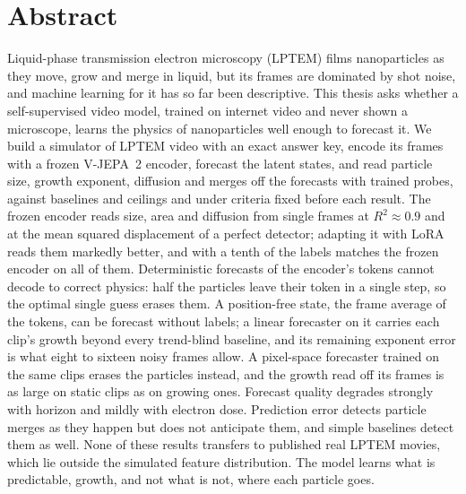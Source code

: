 \section*{Abstract}

Liquid-phase transmission electron microscopy (LPTEM) films nanoparticles as they move,
grow and merge in liquid, but its frames are dominated by shot noise, and machine
learning for it has so far been descriptive. This thesis asks whether a self-supervised
video model, trained on internet video and never shown a microscope, learns the physics
of nanoparticles well enough to forecast it. We build a simulator of LPTEM video with an
exact answer key, encode its frames with a frozen V-JEPA~2 encoder, forecast the latent
states, and read particle size, growth exponent, diffusion and merges off the forecasts
with trained probes, against baselines and ceilings and under criteria fixed before each
result. The frozen encoder reads size, area and diffusion from single frames at
$R^2 \approx 0.9$ and at the mean squared displacement of a perfect detector; adapting it
with LoRA reads them markedly better, and with a tenth of the labels matches the frozen
encoder on all of them. Deterministic forecasts of the encoder's tokens cannot decode to
correct physics: half the particles leave their token in a single step, so the optimal
single guess erases them. A position-free state, the frame average of the tokens, can be
forecast without labels; a linear forecaster on it carries each clip's growth beyond every
trend-blind baseline, and its remaining exponent error is what eight to sixteen noisy
frames allow. A pixel-space forecaster trained on the same clips erases the particles
instead, and the growth read off its frames is as large on static clips as on growing ones. Forecast quality degrades strongly with horizon and mildly with electron
dose. Prediction error detects particle merges as they happen but does not anticipate
them, and simple baselines detect them as well. None of these results transfers to
published real LPTEM movies, which lie outside the simulated feature distribution. The
model learns what is predictable, growth, and not what is not, where each particle goes.

\medskip{}
